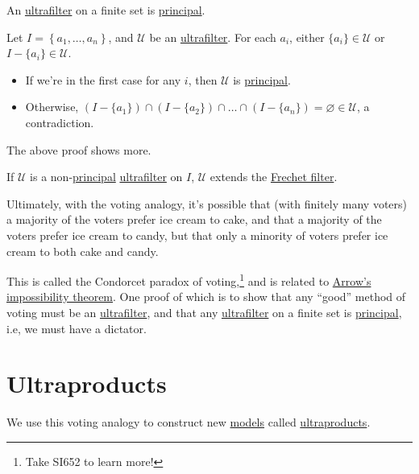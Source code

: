\begin{remark}
	An \hyperref[def:ultrafilter]{ultrafilter} on a finite set is \hyperref[eg:principal-filter]{principal}.
\end{remark}
\begin{explanation}
	Let \(I = \left\{ a_1, \dots , a_n \right\} \), and \(\mathcal{U} \) be an \hyperref[def:ultrafilter]{ultrafilter}. For each \(a_i\), either \(\{a_i\} \in \mathcal{U} \) or \(I - \{a_i\} \in \mathcal{U} \).
	\begin{itemize}
		\item If we're in the first case for any \(i\), then \(\mathcal{U} \) is \hyperref[eg:principal-filter]{principal}.
		\item Otherwise, \((I - \{a_1\}) \cap (I-\{a_2\}) \cap \dots \cap (I-\{a_n\}) = \varnothing \in \mathcal{U} \), a contradiction.
	\end{itemize}
\end{explanation}

The above proof shows more.

\begin{remark}
	If \(\mathcal{U} \) is a non-\hyperref[eg:principal-filter]{principal} \hyperref[def:ultrafilter]{ultrafilter} on \(I\), \(\mathcal{U} \) extends the \hyperref[eg:Frechet-filter]{Frechet filter}.
\end{remark}

Ultimately, with the voting analogy, it's possible that (with finitely many voters) a majority of the voters prefer ice cream to cake, and that a majority of the voters prefer ice cream to candy, but that only a minority of voters prefer ice cream to both cake and candy.

\begin{note}
	This is called the Condorcet paradox of voting,\footnote{Take SI652 to learn more!} and is related to \href{https://en.wikipedia.org/wiki/Arrow's_impossibility_theorem}{Arrow's impossibility theorem}. One proof of which is to show that any ``good'' method of voting must be an \hyperref[def:ultrafilter]{ultrafilter}, and that any \hyperref[def:ultrafilter]{ultrafilter} on a finite set is \hyperref[eg:principal-filter]{principal}, i.e, we must have a dictator.
\end{note}

\section{Ultraproducts}
We use this voting analogy to construct new \hyperref[def:model]{models} called \hyperref[def:ultraproduct]{ultraproducts}.

